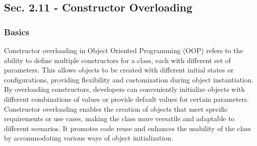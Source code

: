 \subsection*{Sec. 2.11 - Constructor Overloading}
\subsubsection*{Basics}

Constructor overloading in Object Oriented Programming (OOP) refers to the ability to define multiple constructors for a class, each with different set of parameters. This allows objects to be created with different initial states or configurations, providing flexibility and customization 
during object instantiation. By overloading constructors, developers can conveniently initialize objects with different combinations of values or provide default values for certain parameters. Constructor overloading enables the creation of objects that meet specific requirements or use cases, 
making the class more versatile and adaptable to different scenarios. It promotes code reuse and enhances the usability of the class by accommodating various ways of object initialization.

